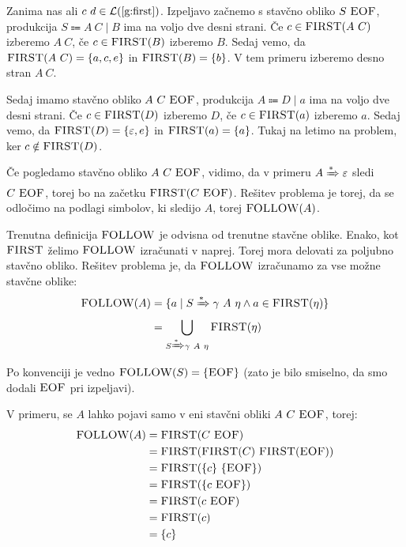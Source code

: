 \documentclass{article}
\newcommand{\FIRST}{\textsc{FIRST}}
\newcommand{\FOLLOW}{\textsc{FOLLOW}}
\newcommand{\EOF}{\textsc{EOF}}
\newcommand{\Null}{\varepsilon}
\newcommand{\Language}[1]{\mathcal{L}(#1)}
\newcommand{\Arrow}{\Coloneqq}
\newcommand{\DeriveStar}{\xRightarrow{\ast}}
\newcommand{\Seq}{\ }
\newcommand{\Union}{\mathrel{|}}
\begin{document}
Zanima nas ali $c \Seq d \in \Language{\text{\ref{g:first}}}$.
Izpeljavo začnemo s stavčno obliko $S \Seq \EOF$, produkcija $S \Arrow A \Seq C \Union B$ ima na voljo dve desni strani.
Če $c \in \FIRST(A \Seq C)$ izberemo $A \Seq C$, če $c \in \FIRST(B)$ izberemo $B$.
Sedaj vemo, da $\FIRST(A \Seq C) = \{a, c, e\}$ in $\FIRST(B) = \{b\}$.
V tem primeru izberemo desno stran $A \Seq C$.

Sedaj imamo stavčno obliko $A \Seq C \Seq \EOF$, produkcija $A \Arrow D \Union a$ ima na voljo dve desni strani.
Če $c \in \FIRST(D)$ izberemo $D$, če $c \in \FIRST(a)$ izberemo $a$.
Sedaj vemo, da $\FIRST(D) = \{\Null, e\}$ in $\FIRST(a) = \{a\}$.
Tukaj na letimo na problem, ker $c \notin \FIRST(D)$.

Če pogledamo stavčno obliko $A \Seq C \Seq \EOF$, vidimo, da v primeru $A \DeriveStar \varepsilon$ sledi $C \Seq \EOF$, torej bo na začetku $\FIRST(C \Seq \EOF)$.
Rešitev problema je torej, da se odločimo na podlagi simbolov, ki sledijo $A$, torej $\FOLLOW(A)$.

Trenutna definicija $\FOLLOW$ je odvisna od trenutne stavčne oblike.
Enako, kot $\FIRST$ želimo $\FOLLOW$ izračunati v naprej.
Torej mora delovati za poljubno stavčno obliko.
Rešitev problema je, da $\FOLLOW$ izračunamo za vse možne stavčne oblike:
\begin{align*}
  \FOLLOW(A) &= \{a \mid S \DeriveStar \gamma \Seq A \Seq \eta \land a \in \FIRST(\eta)\}\\
  &= \bigcup_{S \DeriveStar \gamma \Seq A \Seq \eta} \FIRST(\eta)
\end{align*}
Po konvenciji je vedno $\FOLLOW(S) = \{\EOF\}$ (zato je bilo smiselno, da smo dodali $\EOF$ pri izpeljavi).

V primeru, se $A$ lahko pojavi samo v eni stavčni obliki $A \Seq C \Seq \EOF$, torej:
\begin{align*}
  \FOLLOW(A) &= \FIRST(C \Seq \EOF) \\
             &= \FIRST(\FIRST(C) \Seq \FIRST(\EOF))\\
             &= \FIRST(\{c\} \Seq \{\EOF\})\\
             &= \FIRST(\{c \Seq \EOF\})\\
             &= \FIRST(c \Seq \EOF) \\
             &= \FIRST(c)\\
             &= \{c\}
\end{align*}
\end{document}
